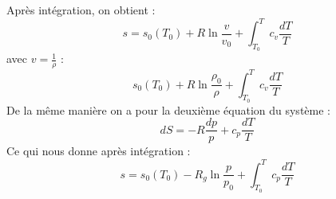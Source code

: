 Après intégration, on obtient :
\begin{equation} s = s_0(T_0) + R\ln{\frac{v}{v_0}} + \int_{T_0}^T c_v\frac{dT}{T} \end{equation}
avec $v = \frac{1}{\rho}$ :
\begin{equation} s_0(T_0) + R\ln{\frac{\rho_0}{\rho}} + \int_{T_0}^T c_v\frac{dT}{T} \end{equation}
De la même manière on a pour la deuxième équation du système :
\begin{equation} dS = -R\frac{dp}{p} + c_p\frac{dT}{T} \end{equation}
Ce qui nous donne après intégration :
\begin{equation} s = s_0(T_0) - R_g\ln{\frac{p}{p_0}} + \int_{T_0}^T c_p\frac{dT}{T} \end{equation}

